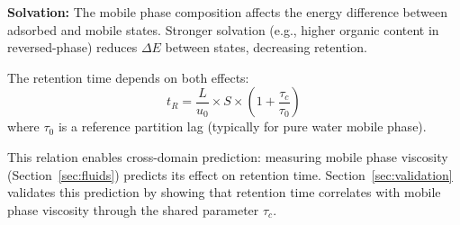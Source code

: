 \documentclass[twocolumn,superscriptaddress,prb,10pt]{revtex4-2}
\begin{document}
\textbf{Solvation:} The mobile phase composition affects the energy difference between adsorbed and mobile states. Stronger solvation (e.g., higher organic content in reversed-phase) reduces $\Delta E$ between states, decreasing retention.

The retention time depends on both effects:
\begin{equation}
t_R = \frac{L}{u_0} \times S \times \left(1 + \frac{\tau_c}{\tau_0}\right)
\label{eq:retention_viscosity}
\end{equation}
where $\tau_0$ is a reference partition lag (typically for pure water mobile phase).

This relation enables cross-domain prediction: measuring mobile phase viscosity (Section~\ref{sec:fluids}) predicts its effect on retention time. Section~\ref{sec:validation} validates this prediction by showing that retention time correlates with mobile phase viscosity through the shared parameter $\tau_c$.
\end{document}
